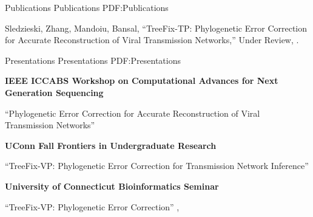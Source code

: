 \documentclass[letterpaper,MMMyyyy,nonstopmode]{simpleresumecv}
\begin{document}
\begin{Body}

\Section
{Publications}
{Publications}
{PDF:Publications}



\Gap
\NumberedItem{[1]}
{Sledzieski, Zhang, Mandoiu, Bansal,
``TreeFix-TP: Phylogenetic Error Correction for Accurate Reconstruction of Viral Transmission Networks,''
Under Review,
.}







\Section
{Presentations}
{Presentations}
{PDF:Presentations}

\Entry
{\textbf{IEEE ICCABS Workshop on Computational Advances for Next Generation Sequencing}}

\Gap
\BulletItem
``Phylogenetic Error Correction for Accurate Reconstruction of
\newline
Viral Transmission Networks''
\hfill
{}
\BigGap

\Entry
{\textbf{UConn Fall Frontiers in Undergraduate Research}}

\Gap
\BulletItem
``TreeFix-VP: Phylogenetic Error Correction for Transmission Network Inference''
\hfill
{}
\BigGap

\Entry
{\textbf{University of Connecticut Bioinformatics Seminar}}

\Gap
\BulletItem
``TreeFix-VP: Phylogenetic Error Correction''
\hfill
{}, 



\end{Body}
\end{document}
